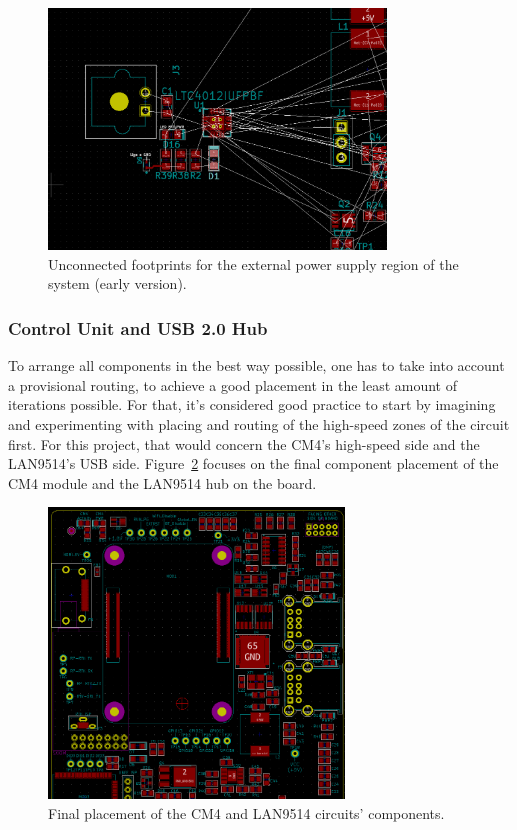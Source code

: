 \begin{figure}[h]
	\centering
	\includegraphics[width=0.8\textwidth]{Chapters/Figures/chapter5/ratsnest.png}
	\caption{Unconnected footprints for the external power supply region of the system (early version).}
	\label{fig:ratsnest}
\end{figure}


\subsubsection{Control Unit and USB 2.0 Hub}\label{sec:5111_CM4_LAN9514}

To arrange all components in the best way possible, one has to take into account a provisional routing, to achieve a good placement in the least amount of iterations possible. For that, it's considered good practice to start by imagining and experimenting with placing and routing of the high-speed zones of the circuit first. For this project, that would concern the CM4's high-speed side and the LAN9514's USB side. Figure~\ref{fig:placement_CM4_LAN9514} focuses on the final component placement of the CM4 module and the LAN9514 hub on the board.

\begin{figure}[h]
	\centering
	\includegraphics[width=0.7\textwidth]{Chapters/Figures/chapter5/placement_CM4_LAN9514.png}
	\caption{Final placement of the CM4 and LAN9514 circuits' components.}
	\label{fig:placement_CM4_LAN9514}
\end{figure}%

